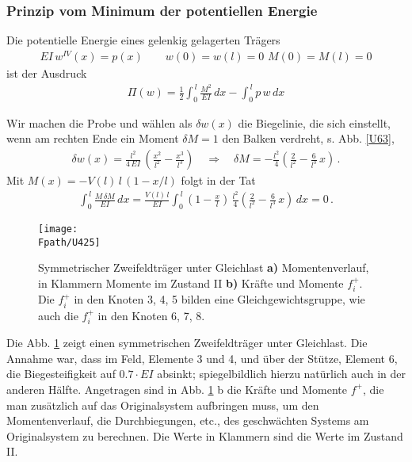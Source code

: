 {{{{{{\textcolor{blau2}{\subsubsection*{Prinzip vom Minimum der potentiellen Energie}}}
Die potentielle Energie eines gelenkig gelagerten Tr\"{a}gers
\begin{align}
EI\,w^{IV}(x) = p(x) \qquad w(0) = w(l) = 0 \,\,M(0) = M(l) = 0
\end{align}
ist der Ausdruck
\begin{align}
\Pi(w) = \frac{1}{2} \int_0^{\,l} \frac{M^2}{EI}\,dx - \int_0^{\,l} p\,w\,dx
\end{align}

Wir machen die Probe und w\"{a}hlen als $\delta w(x)$ die Biegelinie, die sich einstellt, wenn am rechten Ende ein Moment $\delta M = 1$  den Balken verdreht, s. Abb. \ref{U63},
\begin{align}
\delta w(x) = \frac{l^2}{4\,EI}\,(\frac{x^2}{l^2} - \frac{x^3}{l^3}) \quad \Rightarrow \quad \delta M = -\frac{l^2}{4}(\frac{2}{l^2} - \frac{6}{l^3}\,x)\,.
\end{align}
Mit $M(x) = -V(l)\,l\,(1 - x/l)$ folgt in der Tat
\begin{align}
\int_0^{\,l} \frac{M\,\delta M}{EI}\,dx = \frac{V(l)\,l}{EI} \int_0^{\,l} (1 - \frac{x}{l})\,\frac{l^2}{4}(\frac{2}{l^2} - \frac{6}{l^3}\,x)\,dx =  0\,.
\end{align}

\begin{figure}
\centering
\if {} \sidecaption \fi
{\texttt{[image: \\Fpath/U425]}}
\caption{Symmetrischer Zweifeldtr\"{a}ger unter Gleichlast \textbf{ a)} Momentenverlauf, in Klammern Momente im Zustand II \textbf{ b)} Kr\"{a}fte und Momente $f_i^+$. Die $f_i^+$ in den Knoten 3, 4, 5 bilden eine Gleichgewichtsgruppe, wie auch die $f_i^+$ in den Knoten 6, 7, 8. }
\label{U425}
\end{figure}%
Die Abb. \ref{U425} \label{Korrektur32} zeigt einen symmetrischen Zweifeldtr\"{a}ger unter Gleichlast. Die Annahme war, dass im Feld, Elemente 3 und 4, und \"{u}ber der St\"{u}tze, Element 6, die Biegesteifigkeit auf $0.7 \cdot EI$ absinkt; spiegelbildlich hierzu nat\"{u}rlich auch in der anderen H\"{a}lfte. Angetragen sind in Abb. \ref{U425} b die Kr\"{a}fte und Momente $f^+$, die man zus\"{a}tzlich auf das Originalsystem aufbringen muss, um den Momentenverlauf, die Durchbiegungen, etc., des geschw\"{a}chten Systems am Originalsystem zu berechnen. Die Werte in Klammern sind die Werte im Zustand II.



}}}}}
